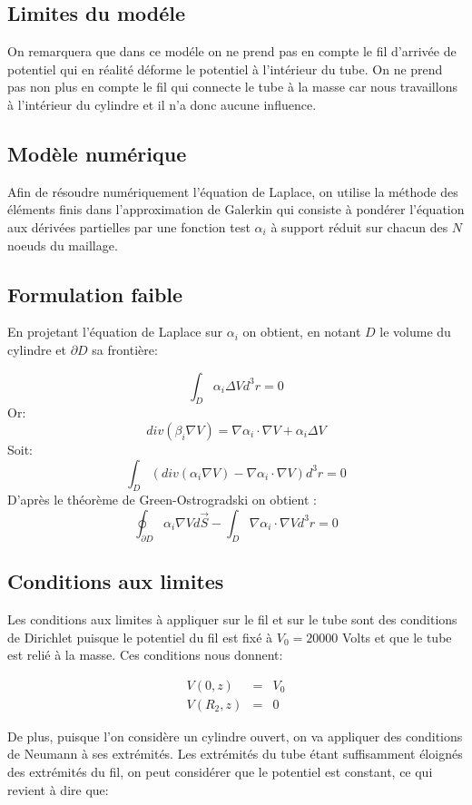 \documentclass[a4paper,12pt]{article}
\begin{document}
\subsection{Limites du modéle}
On remarquera que dans ce modéle on ne prend pas en compte le fil d'arrivée de potentiel qui en réalité déforme le potentiel à l'intérieur du tube. On ne prend pas non plus en compte le fil qui connecte le tube à la masse car nous travaillons à l'intérieur du cylindre et il n'a donc aucune influence.

\subsection{Modèle numérique}
Afin de résoudre numériquement l'équation de Laplace, on utilise la méthode des éléments finis dans l'approximation de Galerkin qui consiste à pondérer l'équation aux dérivées partielles par une fonction test $\alpha_i$ à support réduit sur chacun des $N$ noeuds du maillage.

\subsection{Formulation faible}
En projetant l'équation de Laplace sur $\alpha_i$ on obtient, en notant $D$ le volume du cylindre et $\partial D$ sa frontière:

\[
\int_{D} \alpha_i \Delta V d^3r = 0
\]
Or:
\[
div(\beta_i \nabla V) = \nabla \alpha_i \cdot \nabla V + \alpha_i \Delta V
\]
Soit:
\[
\int_{D} \left( div(\alpha_i \nabla V) - \nabla\alpha_i \cdot \nabla V \right) d^3r = 0
\]
D'après le théorème de Green-Ostrogradski on obtient :
\[
\oint_{\partial D} \alpha_i \nabla V d\vec{S} - \int_{D} \nabla \alpha_i \cdot \nabla V d^3 r = 0
\]

\subsection{Conditions aux limites}
Les conditions aux limites à appliquer sur le fil et sur le tube sont des conditions de Dirichlet puisque le potentiel du fil est fixé à $V_0=20000$ Volts et que le tube est relié à la masse. Ces conditions nous donnent:



\begin{eqnarray}
V(0,z) &=& V_0 \\
V(R_2,z) &=& 0
\end{eqnarray}


De plus, puisque l'on considère un cylindre ouvert, on va appliquer des conditions de Neumann à ses extrémités. Les extrémités du tube étant suffisamment éloignés des extrémités du fil, on peut considérer que le potentiel est constant, ce qui revient à dire que:
\end{document}
